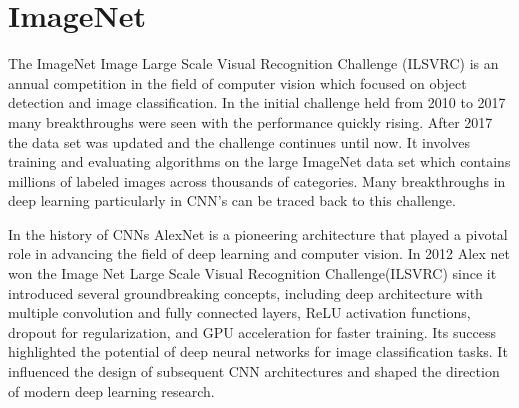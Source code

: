 \documentclass[
a4paper, 
12pt,
grayscalebody, %
abstract=on,
twoside, BCOR10mm, 12pt, DIV13,headinclude, footexclude, final, abstracton, openright
]{ibireprt}
\numberwithin{equation}{chapter}
\numberwithin{table}{chapter}
\numberwithin{figure}{chapter}
\numberwithin{algorithm}{chapter}
\numberwithin{example}{chapter}
\numberwithin{example}{chapter}
\begin{document}
\section{ImageNet}
The ImageNet Image Large Scale Visual Recognition Challenge (ILSVRC) is an annual competition in the field of computer vision which focused on object detection and image classification. In the initial challenge held from 2010 to 2017 many breakthroughs were seen with the performance quickly rising. After 2017 the data set was updated and the challenge continues until now. It involves training and evaluating algorithms on the large ImageNet data set which contains millions of labeled images across thousands of categories. Many breakthroughs in deep learning particularly in CNN's can be traced back to this challenge.

In the history of CNNs AlexNet is a pioneering architecture that played a pivotal role in advancing the field of deep learning and computer vision. \cite{Alzubaidi2021} In 2012 Alex net won the Image Net Large Scale Visual Recognition Challenge(ILSVRC) since it introduced several groundbreaking concepts, including deep architecture with multiple convolution and fully connected layers, ReLU activation functions, dropout for regularization, and GPU acceleration for faster training. Its success highlighted the potential of deep neural networks for image classification tasks. It influenced the design of subsequent CNN architectures and shaped the direction of modern deep learning research.
\end{document}
